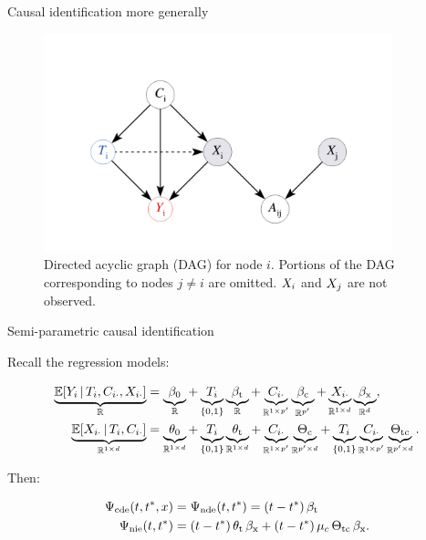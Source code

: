 \documentclass{beamer}
\theoremstyle{remark}
\begin{document}
\begin{frame}{Causal identification more generally}

    \centering

    \begin{figure}
        \includegraphics[width=0.9\textwidth]{figures/mediating.png}
        \caption{Directed acyclic graph (DAG) for node $i$. Portions of the DAG corresponding to nodes $j \neq i$ are omitted. $X_i$ and $X_j$ are not observed.}
        \label{fig:mediating}
    \end{figure}

\end{frame}



\begin{frame}{Semi-parametric causal identification}

    Recall the regression models:

    \begin{equation*}
        \begin{aligned}
            \underbrace{\E[T_i, \C_{i \cdot}, \X_{i \cdot}]{Y_i}}_{\R}
             & = \underbrace{\betazero}_{\R}
            + \underbrace{T_i}_{\{0, 1\}} \underbrace{\betat}_{\R}
            + \underbrace{\C_{i \cdot}}_{\R^{1 \times p'}} \underbrace{\betac}_{\R^{p'}}
            + \underbrace{\X_{i \cdot}}_{\R^{1 \times d}} \underbrace{\betax}_{\R^d}, \\
            \underbrace{\E[T_i, \C_{i \cdot}]{\X_{i \cdot}}}_{\R^{1 \times d}}
             & = \underbrace{\thetazero}_{\R^{1 \times d}}
            + \underbrace{T_i}_{\{0, 1\}} \underbrace{\thetat}_{\R^{1 \times d}}
            + \underbrace{\C_{i \cdot}}_{\R^{1 \times p'}} \underbrace{\Thetac}_{\R^{p' \times d}}
            + \underbrace{T_i}_{\{0, 1\}} \underbrace{\C_{i \cdot}}_{\R^{1 \times p'}} \underbrace{\Thetatc}_{\R^{p' \times d}}.
        \end{aligned}
    \end{equation*}

    Then:

    \begin{align*}
        \cdef & = \ndef = \paren*{t - t^*} \, \betat                                                \\
        \nief & = \paren*{t - t^*} \, \thetat \, \betax + (t - t^*) \, \mu_c \, \Thetatc \, \betax.
    \end{align*}

\end{frame}
\end{document}
